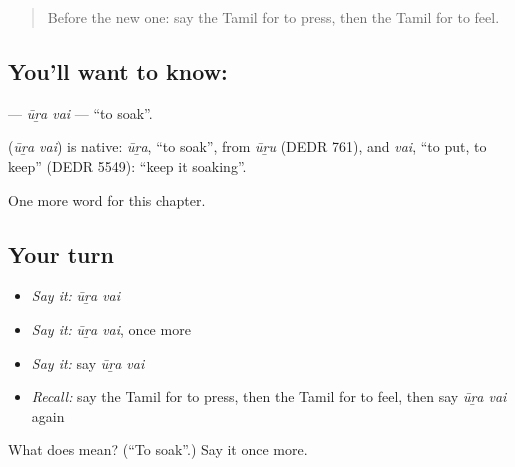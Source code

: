 \begin{quote}
Before the new one: say the Tamil for to press, then the Tamil for to feel.
\end{quote}

\subsection*{You'll want to know:  }
\textbf{ } — \emph{ūṟa vai} — \textquotedblleft{}to soak\textquotedblright{}.

\begin{cousinweb}
\textbf{ } (\emph{ūṟa vai}) is native: \emph{ūṟa}, \textquotedblleft{}to soak\textquotedblright{}, from \emph{ūṟu} (DEDR 761), and \emph{vai}, \textquotedblleft{}to put, to keep\textquotedblright{} (DEDR 5549): \textquotedblleft{}keep it soaking\textquotedblright{}.
\end{cousinweb}

\begin{grammarlens}[title={What you've built}]
One more word for this chapter.
\end{grammarlens}

\subsection*{Your turn}
\begin{itemize}
\raggedright
  \item \emph{Say it:} \emph{ūṟa vai}
  \item \emph{Say it:} \emph{ūṟa vai}, once more
  \item \emph{Say it:} say \emph{ūṟa vai}
  \item \emph{Recall:} say the Tamil for to press, then the Tamil for to feel, then say \emph{ūṟa vai} again
\end{itemize}

\begin{tcolorbox}[breakable,colback=teal!4,colframe=teal!35!black,title={Before you move on}]
What does   mean? (\textquotedblleft{}To soak\textquotedblright{}.) Say it once more.
\end{tcolorbox}

